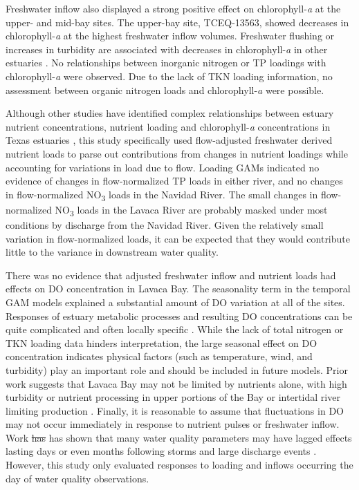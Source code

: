 \documentclass[fleqn,10pt,lineno]{wlpeerj} %
\providecommand{\DIFdeltex}[1]{{\protect\color{red}\sout{#1}}}                      %
\providecommand{\DIFdelbegin}{} %
\providecommand{\DIFdelend}{} %
\providecommand{\DIFdel}[1]{\texorpdfstring{\DIFdeltex{#1}}{}} %
\begin{document}
Freshwater inflow also displayed a strong positive effect on
chlorophyll-\emph{a} at the upper- and mid-bay sites. The upper-bay
site, TCEQ-13563, showed decreases in chlorophyll-\emph{a} at the
highest freshwater inflow volumes. Freshwater flushing or increases in
turbidity are associated with decreases in chlorophyll-\emph{a} in other
estuaries
\autocite{peierlsNonmonotonicResponsesPhytoplankton2012,cloernPhytoplanktonPrimaryProduction2014}.
No relationships between inorganic nitrogen or TP loadings with
chlorophyll-\emph{a} were observed. Due to the lack of TKN loading
information, no assessment between organic nitrogen loads and
chlorophyll-\emph{a} were possible.

Although other studies have identified complex relationships between
estuary nutrient concentrations, nutrient loading and
chlorophyll-\emph{a} concentrations in Texas estuaries
\autocite{ornolfsdottirNutrientPulsingRegulator2004,doradoUnderstandingInteractionsFreshwater2015,ciraPhytoplanktonDynamicsLowinflow2021,tominackVariabilityPhytoplanktonBiomass2022},
this study specifically used flow-adjusted freshwater derived nutrient
loads to parse out contributions from changes in nutrient loadings while
accounting for variations in load due to flow. Loading GAMs indicated no
evidence of changes in flow-normalized TP loads in either river, and no
changes in flow-normalized NO\textsubscript{3} loads in the Navidad
River. The small changes in flow-normalized NO\textsubscript{3} loads in
the Lavaca River are probably masked under most conditions by discharge
from the Navidad River. Given the relatively small variation in
flow-normalized loads, it can be expected that they would contribute
little to the variance in downstream water quality.

There was no evidence that adjusted freshwater inflow and nutrient loads
had effects on DO concentration in Lavaca Bay. The seasonality term in
the temporal GAM models explained a substantial amount of DO variation
at all of the sites. Responses of estuary metabolic processes and
resulting DO concentrations can be quite complicated and often locally
specific \autocite{caffreyFactorsControllingNet2004}. While the lack of
total nitrogen or TKN loading data hinders interpretation, the large
seasonal effect on DO concentration indicates physical factors (such as
temperature, wind, and turbidity) play an important role and should be
included in future models. Prior work suggests that Lavaca Bay may not
be limited by nutrients alone, with high turbidity or nutrient
processing in upper portions of the Bay or intertidal river limiting
production \autocite{russell_effect_2006}. Finally, it is reasonable to
assume that fluctuations in DO may not occur immediately in response to
nutrient pulses or freshwater inflow. Work \DIFdelbegin \DIFdel{has }\DIFdelend has shown that many water
quality parameters may have lagged effects lasting days or even months
following storms and large discharge events
\autocite{mooneyWatershedExportEvents2012a,wetzExtremeFutureEstuaries2013,bukaveckasInfluenceStormEvents2020,walkerTimescalesMagnitudeWater2021}.
However, this study only evaluated responses to loading and inflows
occurring the day of water quality observations.
\end{document}

